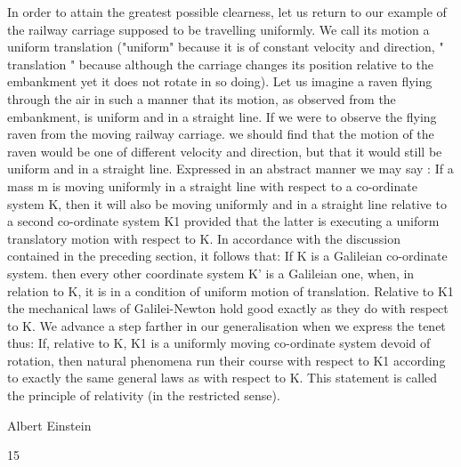\documentclass{article}
\begin{document}
In order to attain the greatest possible clearness, let us return to our example of the
railway carriage supposed to be travelling uniformly. We call its motion a uniform
translation ("uniform" because it is of constant velocity and direction, " translation "
because although the carriage changes its position relative to the embankment yet it does
not rotate in so doing). Let us imagine a raven flying through the air in such a manner that
its motion, as observed from the embankment, is uniform and in a straight line. If we were
to observe the flying raven from the moving railway carriage. we should find that the
motion of the raven would be one of different velocity and direction, but that it would still
be uniform and in a straight line. Expressed in an abstract manner we may say : If a mass m
is moving uniformly in a straight line with respect to a co-ordinate system K, then it will
also be moving uniformly and in a straight line relative to a second co-ordinate system K1
provided that the latter is executing a uniform translatory motion with respect to K. In
accordance with the discussion contained in the preceding section, it follows that:
If K is a Galileian co-ordinate system. then every other coordinate system K' is a Galileian one, when, in relation to K, it is
in a condition of uniform motion of translation. Relative to K1 the
mechanical laws of Galilei-Newton hold good exactly as they do
with respect to K.
We advance a step farther in our generalisation when we express the tenet thus: If,
relative to K, K1 is a uniformly moving co-ordinate system devoid of rotation, then natural
phenomena run their course with respect to K1 according to exactly the same general laws
as with respect to K. This statement is called the principle of relativity (in the restricted
sense).

Albert Einstein

15
\end{document}
